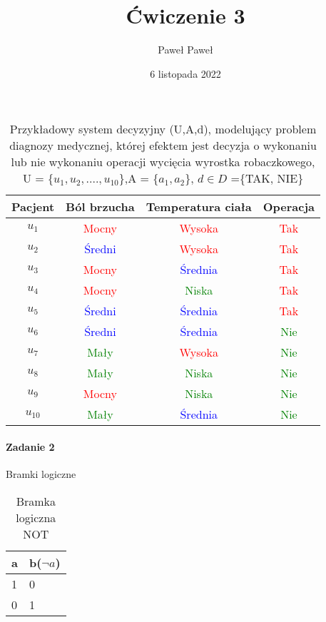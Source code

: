 \documentclass[12pt, letterpaper, titlepage]{article}
\title{Ćwiczenie 3}
\author{Paweł Paweł}
\date{6 listopada 2022}
\begin{document}
\maketitle

\begin{table}
\centering\caption
{Przykładowy system decyzyjny (U,A,d), modelujący problem diagnozy medycznej, której efektem jest decyzja o wykonaniu lub nie wykonaniu operacji wycięcia wyrostka robaczkowego, U = \{$u_{1},u_{2},....,u_{10}$\},A = \{$a_{1}, a_{2}$\}, $d\in D$ =\{TAK, NIE\}}
\begin{tabular}{c|c c c}
\hline
Pacjent & Ból brzucha & Temperatura ciała & Operacja\\
\hline
$u_{1}$ & \textcolor{red}{Mocny} & \textcolor{red}{Wysoka} & \textcolor{red}{Tak}\\
$u_{2}$ & \textcolor{blue}{Średni} & \textcolor{red}{Wysoka} & \textcolor{red}{Tak}\\
$u_{3}$ & \textcolor{red}{Mocny} & \textcolor{blue}{Średnia} & \textcolor{red}{Tak}\\
$u_{4}$ & \textcolor{red}{Mocny} & \textcolor{green}{Niska} & \textcolor{red}{Tak}\\
$u_{5}$ & \textcolor{blue}{Średni} & \textcolor{blue}{Średnia} & \textcolor{red}{Tak}\\
$u_{6}$ & \textcolor{blue}{Średni} & \textcolor{blue}{Średnia} & \textcolor{green}{Nie}\\
$u_{7}$ & \textcolor{green}{Mały} & \textcolor{red}{Wysoka} & \textcolor{green}{Nie}\\
$u_{8}$ & \textcolor{green}{Mały} & \textcolor{green}{Niska} & \textcolor{green}{Nie}\\
$u_{9}$ & \textcolor{red}{Mocny} & \textcolor{green}{Niska} & \textcolor{green}{Nie}\\
$u_{10}$ & \textcolor{green}{Mały} & \textcolor{blue}{Średnia} & \textcolor{green}{Nie}\\
\hline
\end{tabular}
\end{table}
\paragraph{Zadanie 2}


Bramki logiczne
\\
\begin{table}[h]
\centering\caption{Bramka logiczna NOT}
\begin{tabular}{l|l}
\hline a & b($\neg a$)\\
\hline
1 & 0\\
0 & 1\\

\end{tabular}
\end{table}
\end{document}
